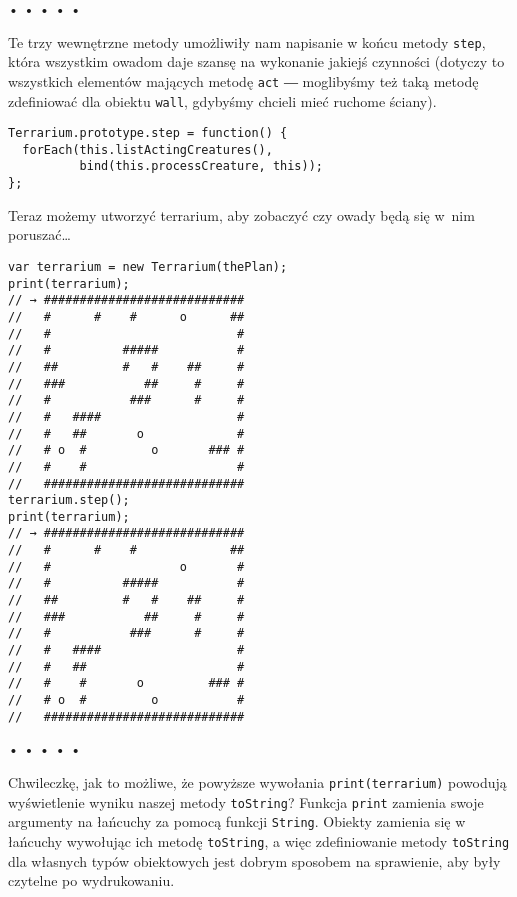 \begin{center}
• • • • •
\end{center}

  
Te trzy wewnętrzne metody umożliwiły nam napisanie w końcu metody \texttt{step}, która wszystkim owadom daje szansę na wykonanie jakiejś czynności (dotyczy to wszystkich elementów mających metodę \texttt{act} ― moglibyśmy też taką metodę zdefiniować dla obiektu \texttt{wall}, gdybyśmy chcieli mieć ruchome ściany).

  
\begin{verbatim} 
Terrarium.prototype.step = function() {
  forEach(this.listActingCreatures(),
          bind(this.processCreature, this));
};
\end{verbatim}
  
Teraz możemy utworzyć terrarium, aby zobaczyć czy owady będą się w~nim poruszać…

  
\begin{verbatim} 
var terrarium = new Terrarium(thePlan);
print(terrarium);
// → ############################
//   #      #    #      o      ##
//   #                          #
//   #          #####           #
//   ##         #   #    ##     #
//   ###           ##     #     #
//   #           ###      #     #
//   #   ####                   #
//   #   ##       o             #
//   # o  #         o       ### #
//   #    #                     #
//   ############################
terrarium.step();
print(terrarium);
// → ############################
//   #      #    #             ##
//   #                  o       #
//   #          #####           #
//   ##         #   #    ##     #
//   ###           ##     #     #
//   #           ###      #     #
//   #   ####                   #
//   #   ##                     #
//   #    #       o         ### #
//   # o  #         o           #
//   ############################
\end{verbatim}


\begin{center}
• • • • •
\end{center}

  
Chwileczkę, jak to możliwe, że powyższe wywołania \texttt{print(terrarium)} powodują wyświetlenie wyniku naszej metody \texttt{toString}? Funkcja \texttt{print} zamienia swoje argumenty na łańcuchy za pomocą funkcji \texttt{String}. Obiekty zamienia się w łańcuchy wywołując ich metodę \texttt{toString}, a więc zdefiniowanie metody \texttt{toString} dla własnych typów obiektowych jest dobrym sposobem na sprawienie, aby były czytelne po wydrukowaniu.

